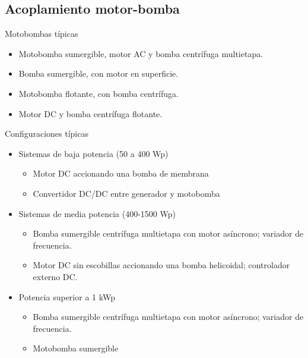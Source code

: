 \documentclass[xcolor={usenames,svgnames,dvipsnames}]{beamer}
\begin{document}
\subsection{Acoplamiento motor-bomba}
\label{sec-2-3}

\begin{frame}[label=sec-2-3-1]{Motobombas típicas}
\begin{itemize}
\item Motobomba sumergible, motor AC y bomba centrífuga multietapa.

\item Bomba sumergible, con motor en superficie.

\item Motobomba flotante, con bomba centrífuga.

\item Motor DC y bomba centrífuga flotante.
\end{itemize}
\end{frame}

\begin{frame}[label=sec-2-3-2]{Configuraciones típicas}
\begin{itemize}
\item \alert{Sistemas de baja potencia (50 a 400 Wp)}

\begin{itemize}
\item Motor DC accionando una bomba de membrana

\item Convertidor DC/DC entre generador y motobomba
\end{itemize}

\item \alert{Sistemas de media potencia (400-1500 Wp)}

\begin{itemize}
\item Bomba sumergible centrífuga multietapa con motor asíncrono;
variador de frecuencia.

\item Motor DC sin escobillas accionando una bomba helicoidal;
controlador externo DC.
\end{itemize}

\item \alert{Potencia superior a 1 kWp}

\begin{itemize}
\item Bomba sumergible centrífuga multietapa con motor asíncrono;
variador de frecuencia.

\item Motobomba sumergible
\end{itemize}
\end{itemize}
\end{frame}
\end{document}
